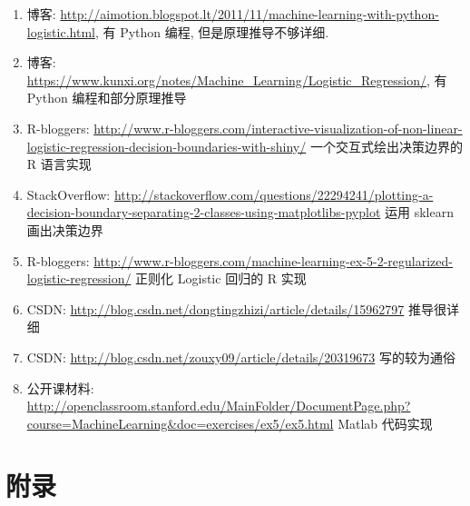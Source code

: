\documentclass[a4paper,UTF8]{ctexart}
\theoremstyle{plain} \newtheorem{theorem}{定理}[section]
\theoremstyle{plain} \newtheorem{definition}{定义}[section]
\theoremstyle{plain} \newtheorem{lemma}{引理}[section]
\theoremstyle{plain} \newtheorem{proposition}{命题}[section]
\theoremstyle{plain} \newtheorem{example}{例}[section]
\theoremstyle{plain} \newtheorem{remark}{注}[section]
\theoremstyle{plain} \newtheorem{corollary}{推论}[section]
\begin{document}
\begin{enumerate}[(1)]
\item 博客: \url{http://aimotion.blogspot.lt/2011/11/machine-learning-with-python-logistic.html}, 有 Python 编程, 但是原理推导不够详细.
\item 博客: \url{https://www.kunxi.org/notes/Machine_Learning/Logistic_Regression/}, 有 Python 编程和部分原理推导
\item R-bloggers: \url{http://www.r-bloggers.com/interactive-visualization-of-non-linear-logistic-regression-decision-boundaries-with-shiny/} 一个交互式绘出决策边界的 R 语言实现
\item StackOverflow: \url{http://stackoverflow.com/questions/22294241/plotting-a-decision-boundary-separating-2-classes-using-matplotlibs-pyplot} 运用 sklearn 画出决策边界
\item R-bloggers: \url{http://www.r-bloggers.com/machine-learning-ex-5-2-regularized-logistic-regression/} 正则化 Logistic 回归的 R 实现
\item CSDN: \url{http://blog.csdn.net/dongtingzhizi/article/details/15962797} 推导很详细
\item CSDN: \url{http://blog.csdn.net/zouxy09/article/details/20319673} 写的较为通俗
\item 公开课材料: \url{http://openclassroom.stanford.edu/MainFolder/DocumentPage.php?course=MachineLearning&doc=exercises/ex5/ex5.html} Matlab 代码实现
\end{enumerate}





\newpage

\section*{附录}
\end{document}
